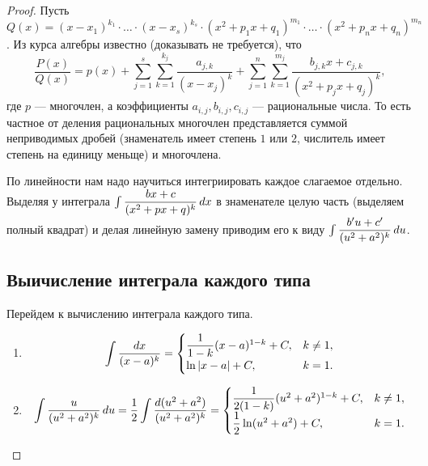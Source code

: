 \documentclass[a4paper]{article}
\theoremstyle{named}
\renewcommand{\int}{\intop}
\begin{document}
        \begin{proof}
            Пусть $Q(x) = (x - x_1)^{k_1} \cdot \dots \cdot (x - x_s)^{k_s} \cdot (x^2 + p_1x + q_1)^{m_1} \cdot \dots \cdot (x^2 + p_nx + q_n)^{m_n}$. Из курса алгебры известно (доказывать не требуется), что
            \begin{equation*}
                \dfrac{P(x)}{Q(x)} = p(x) + \sum_{j = 1}^s \sum_{k = 1}^{k_j} \dfrac{a_{j, k}}{(x - x_j)^k} + \sum_{j = 1}^n \sum_{k = 1}^{m_j} \dfrac{b_{j, k}x + c_{j, k}}{(x^2 + p_jx + q_j)^k},
            \end{equation*}
            где $p$ --- многочлен, а коэффициенты $a_{i, j}, b_{i, j}, c_{i, j}$ --- рациональные числа. То есть частное от деления рациональных многочлен представляется суммой неприводимых дробей (знаменатель имеет степень $1$ или $2$, числитель имеет степень на единицу меньще) и многочлена.

            По линейности нам надо научиться интегриировать каждое слагаемое отдельно. Выделяя у интеграла $\int \dfrac{bx + c}{(x^2 + px + q)^k} \dd x$ в знаменателе целую часть (выделяем полный квадрат) и делая линейную замену приводим его к виду $\int \dfrac{b'u + c'}{(u^2 + a^2)^k} \dd u$.

            \subsection{Выичисление интеграла каждого типа}

            Перейдем к вычислению интеграла каждого типа.

            \begin{enumerate}
            \item
                \begin{equation*}
                    \int \dfrac{\dd x}{(x - a)^k} = \begin{cases}
                        \dfrac{1}{1 - k}(x - a)^{1 - k} + C, &k \neq 1, \\
                        \ln |x - a| + C, &k = 1.
                    \end{cases}
                \end{equation*}

            \item
                \begin{equation*}
                    \int \dfrac{u}{(u^2 + a^2)^k} \dd u
                    = \dfrac{1}{2} \int \dfrac{\dd (u^2 + a^2)}{(u^2 + a^2)^k}
                    = \begin{cases}
                        \dfrac{1}{2(1 - k)}(u^2 + a^2)^{1 - k} + C, &k \neq 1, \\
                        \dfrac{1}{2} \ln(u^2 + a^2) + C, &k = 1.
                    \end{cases}
                \end{equation*}


\end{enumerate}
\end{proof}
\end{document}
